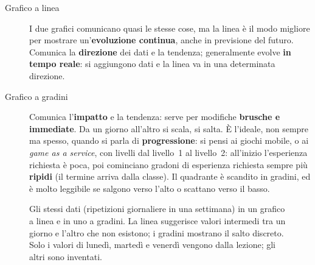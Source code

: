 \begin{description}
  \item[Grafico a linea] I due grafici comunicano quasi le stesse cose, ma
        la linea è il modo migliore per mostrare un'\textbf{evoluzione
        continua}, anche in previsione del futuro. Comunica la
        \textbf{direzione} dei dati e la tendenza; generalmente evolve
        \textbf{in tempo reale}: si aggiungono dati e la linea va in una
        determinata direzione.
  \item[Grafico a gradini] Comunica l'\textbf{impatto} e la tendenza: serve
        per modifiche \textbf{brusche e immediate}. Da un giorno all'altro si
        scala, si salta. È l'ideale, non sempre ma spesso, quando si parla di
        \textbf{progressione}: si pensi ai giochi mobile, o ai \emph{game as
        a service}, con livelli dal livello~1 al livello~2: all'inizio
        l'esperienza richiesta è poca, poi cominciano gradoni di esperienza
        richiesta sempre più \textbf{ripidi} (il termine arriva dalla
        classe). Il quadrante è scandito in gradini, ed è molto leggibile se
        salgono verso l'alto o scattano verso il basso.
\end{description}

\begin{figure}[htbp]
\centering
{}
\caption{Gli stessi dati (ripetizioni giornaliere in una settimana) in un
grafico a linea e in uno a gradini. La linea suggerisce valori intermedi tra
un giorno e l'altro che non esistono; i gradini mostrano il salto discreto.
Solo i valori di lunedì, martedì e venerdì vengono dalla lezione; gli altri
sono inventati.}
\label{fig:linea-gradini}
\end{figure}

